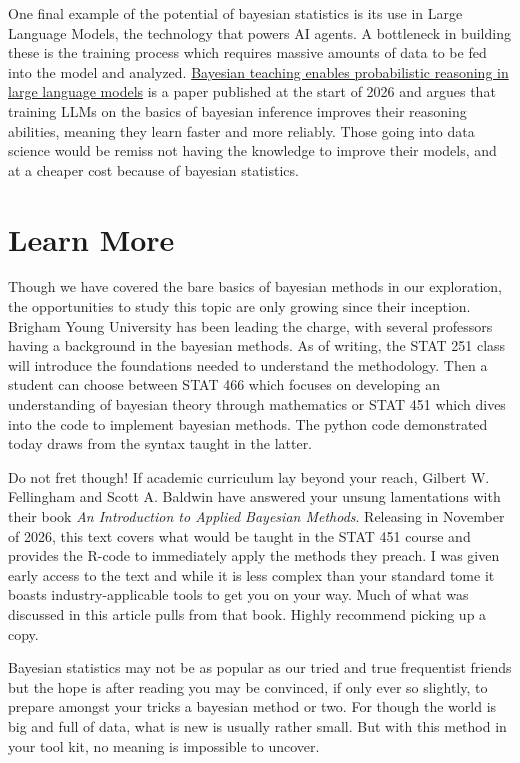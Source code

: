 \documentclass[
  letterpaper,
  DIV=11,
  numbers=noendperiod]{scrartcl}
\begin{document}
One final example of the potential of bayesian statistics is its use in
Large Language Models, the technology that powers AI agents. A
bottleneck in building these is the training process which requires
massive amounts of data to be fed into the model and analyzed.
\href{https://doi.org/10.1038/s41467-025-67998-6}{Bayesian teaching
enables probabilistic reasoning in large language models} is a paper
published at the start of 2026 and argues that training LLMs on the
basics of bayesian inference improves their reasoning abilities, meaning
they learn faster and more reliably. Those going into data science would
be remiss not having the knowledge to improve their models, and at a
cheaper cost because of bayesian statistics.

\section{Learn More}\label{learn-more}

Though we have covered the bare basics of bayesian methods in our
exploration, the opportunities to study this topic are only growing
since their inception. Brigham Young University has been leading the
charge, with several professors having a background in the bayesian
methods. As of writing, the STAT 251 class will introduce the
foundations needed to understand the methodology. Then a student can
choose between STAT 466 which focuses on developing an understanding of
bayesian theory through mathematics or STAT 451 which dives into the
code to implement bayesian methods. The python code demonstrated today
draws from the syntax taught in the latter.

Do not fret though! If academic curriculum lay beyond your reach,
Gilbert W. Fellingham and Scott A. Baldwin have answered your unsung
lamentations with their book \emph{An Introduction to Applied Bayesian
Methods}. Releasing in November of 2026, this text covers what would be
taught in the STAT 451 course and provides the R-code to immediately
apply the methods they preach. I was given early access to the text and
while it is less complex than your standard tome it boasts
industry-applicable tools to get you on your way. Much of what was
discussed in this article pulls from that book. Highly recommend picking
up a copy.

Bayesian statistics may not be as popular as our tried and true
frequentist friends but the hope is after reading you may be convinced,
if only ever so slightly, to prepare amongst your tricks a bayesian
method or two. For though the world is big and full of data, what is new
is usually rather small. But with this method in your tool kit, no
meaning is impossible to uncover.
\end{document}
